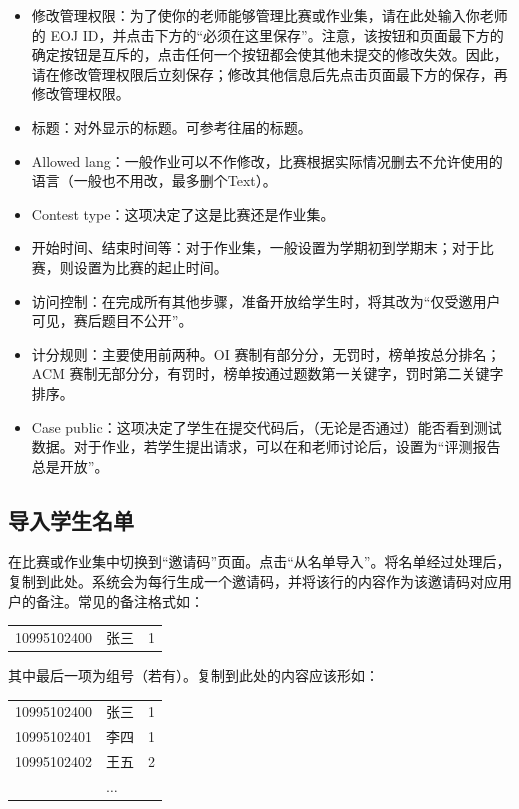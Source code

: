 \documentclass[oneside]{book}
\begin{document}
\begin{itemize}
  \item 修改管理权限：为了使你的老师能够管理比赛或作业集，请在此处输入你老师的 EOJ ID，并点击下方的``必须在这里保存''。注意，该按钮和页面最下方的确定按钮是互斥的，点击任何一个按钮都会使其他未提交的修改失效。因此，请在修改管理权限后立刻保存；修改其他信息后先点击页面最下方的保存，再修改管理权限。
  \item 标题：对外显示的标题。可参考往届的标题。
  \item Allowed lang：一般作业可以不作修改，比赛根据实际情况删去不允许使用的语言（一般也不用改，最多删个Text）。
  \item Contest type：这项决定了这是比赛还是作业集。
  \item 开始时间、结束时间等：对于作业集，一般设置为学期初到学期末；对于比赛，则设置为比赛的起止时间。
  \item 访问控制：在完成所有其他步骤，准备开放给学生时，将其改为``仅受邀用户可见，赛后题目不公开''。
  \item 计分规则：主要使用前两种。OI 赛制有部分分，无罚时，榜单按总分排名；ACM 赛制无部分分，有罚时，榜单按通过题数第一关键字，罚时第二关键字排序。
  \item Case public：这项决定了学生在提交代码后，（无论是否通过）能否看到测试数据。对于作业，若学生提出请求，可以在和老师讨论后，设置为``评测报告总是开放''。
\end{itemize}

\subsection{导入学生名单}

\label{ssec:import_student_list}

在比赛或作业集中切换到``邀请码''页面。点击``从名单导入''。将名单经过处理后，复制到此处。系统会为每行生成一个邀请码，并将该行的内容作为该邀请码对应用户的备注。常见的备注格式如：

\begin{tabular}{lll}
10995102400 & 张三 & 1
\end{tabular}

其中最后一项为组号（若有）。复制到此处的内容应该形如：

\begin{tabular}{lll}
10995102400 & 张三 & 1 \\
10995102401 & 李四 & 1 \\
10995102402 & 王五 & 2 \\
 & $\dots$ & 
\end{tabular}
\end{document}
